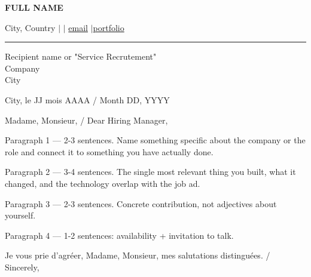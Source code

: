 \documentclass[11pt,a4paper]{article}
\begin{document}

{\selectfont\color{accent}\LARGE\bfseries {{FULL NAME}}}\par
\vspace{2pt}
{\color{graytext}\small {{City, Country}} \quad$\vert$ \quad$\vert$\quad
\href{mailto:{{email}}}{{{email}}} \quad$\vert$\quad \href{{{portfolio url}}}{{{portfolio}}}}\par
\vspace{2pt}
{\color{accent}\rule{\linewidth}{1pt}}

\vspace{10pt}
{\small\color{graytext}
{{Recipient name or "Service Recrutement"}}\\
{{Company}}\\
{{City}}
\par\vspace{6pt}
{{City}}, {{le JJ mois AAAA / Month DD, YYYY}}
}

\vspace{8pt}
{\bfseries{}}

\vspace{6pt}
{{Madame, Monsieur, / Dear Hiring Manager,}}

{{Paragraph 1 — 2-3 sentences. Name something specific about the company or the
role and connect it to something you have actually done.}}

{{Paragraph 2 — 3-4 sentences. The single most relevant thing you built,
what it changed, and the technology overlap with the job ad.}}

{{Paragraph 3 — 2-3 sentences. Concrete contribution, not adjectives about yourself.}}

{{Paragraph 4 — 1-2 sentences: availability + invitation to talk.}}

\vspace{4pt}
{{Je vous prie d'agréer, Madame, Monsieur, mes salutations distinguées. /
Sincerely,}}

\vspace{10pt}
{\bfseries{}}
\end{document}
